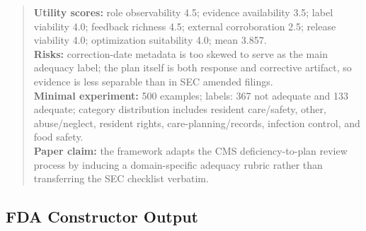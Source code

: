 \documentclass[11pt]{article}
\begin{document}
\begin{quote}
\textbf{Utility scores:} role observability 4.5; evidence availability 3.5; label viability 4.0; feedback richness 4.5; external corroboration 2.5; release viability 4.0; optimization suitability 4.0; mean 3.857. \\
\textbf{Risks:} correction-date metadata is too skewed to serve as the main adequacy label; the plan itself is both response and corrective artifact, so evidence is less separable than in SEC amended filings. \\
\textbf{Minimal experiment:} 500 examples; labels: 367 not adequate and 133 adequate; category distribution includes resident care/safety, other, abuse/neglect, resident rights, care-planning/records, infection control, and food safety. \\
\textbf{Paper claim:} the framework adapts the CMS deficiency-to-plan review process by inducing a domain-specific adequacy rubric rather than transferring the SEC checklist verbatim.
\end{quote}

\subsection{FDA Constructor Output}
\end{document}
